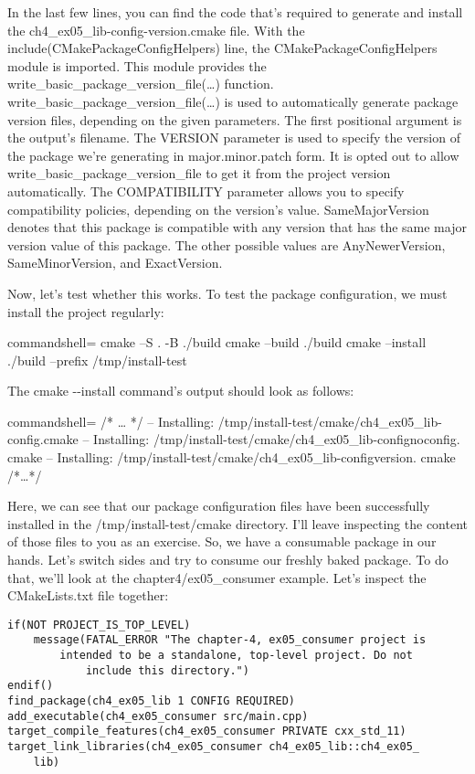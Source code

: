 In the last few lines, you can find the code that's required to generate and install the ch4\_ex05\_lib-config-version.cmake file. With the include(CMakePackageConfigHelpers) line, the CMakePackageConfigHelpers module is imported. This module provides the write\_basic\_package\_version\_file(…) function. write\_basic\_package\_version\_file(…) is used to automatically generate package version files, depending on the given parameters. The first positional argument is the output's filename. The VERSION parameter is used to specify the version of the package we're generating in major.minor.patch form. It is opted out to allow write\_basic\_package\_version\_file to get it from the project version automatically. The COMPATIBILITY parameter allows you to specify compatibility policies, depending on the version's value. SameMajorVersion denotes that this package is compatible with any version that has the same major version value of this package. The other possible values are AnyNewerVersion, SameMinorVersion, and ExactVersion.

Now, let's test whether this works. To test the package configuration, we must install the project regularly:

\begin{tcblisting}{commandshell={}}
cmake –S . -B ./build
cmake --build ./build
cmake --install ./build --prefix /tmp/install-test
\end{tcblisting}

The cmake -{}-install command's output should look as follows:

\begin{tcblisting}{commandshell={}}
/* … */
-- Installing: /tmp/install-test/cmake/ch4_ex05_lib-config.cmake
-- Installing: /tmp/install-test/cmake/ch4_ex05_lib-confignoconfig.
cmake
-- Installing: /tmp/install-test/cmake/ch4_ex05_lib-configversion.
cmake
/*…*/
\end{tcblisting}

Here, we can see that our package configuration files have been successfully installed in the /tmp/install-test/cmake directory. I'll leave inspecting the content of those files to you as an exercise. So, we have a consumable package in our hands. Let's switch sides and try to consume our freshly baked package. To do that, we'll look at the chapter4/ex05\_consumer example. Let's inspect the CMakeLists.txt file together:

\begin{lstlisting}[style=styleCMake]
if(NOT PROJECT_IS_TOP_LEVEL)
	message(FATAL_ERROR "The chapter-4, ex05_consumer project is
		intended to be a standalone, top-level project. Do not
			include this directory.")
endif()
find_package(ch4_ex05_lib 1 CONFIG REQUIRED)
add_executable(ch4_ex05_consumer src/main.cpp)
target_compile_features(ch4_ex05_consumer PRIVATE cxx_std_11)
target_link_libraries(ch4_ex05_consumer ch4_ex05_lib::ch4_ex05_
	lib)
\end{lstlisting}

